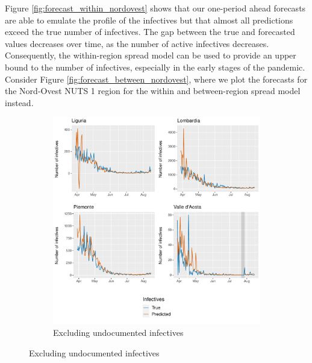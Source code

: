 \documentclass[12pt]{article}
\begin{document}
	Figure \ref{fig:forecast_within_nordovest} shows that our one-period ahead forecasts are able to emulate the profile of the infectives but that almost all predictions exceed the true number of infectives. The gap between the true and forecasted values decreases over time, as the number of active infectives decreases. Consequently, the within-region spread model can be used to provide an upper bound to the number of infectives, especially in the early stages of the pandemic. \\
	
    Consider Figure \ref{fig:forecast_between_nordovest}, where we plot the forecasts for the Nord-Ovest NUTS 1 region for the within and between-region spread model instead.
	
	\begin{figure}[H]
	    \centering
	    \begin{subfigure}{\textwidth}
	      \centering
	      \includegraphics[width=0.94\linewidth]{output/model_between_lag14_forecast_start20_Nord-Ovest_rolling.pdf}
	      \caption{Excluding undocumented infectives}
	      \label{fig:forecast_between_nordovest_regular}
	    \end{subfigure}
    \end{figure}
\end{document}
